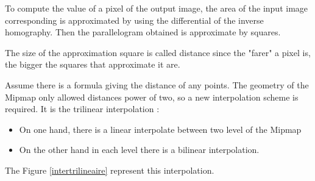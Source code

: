 To compute the value of a pixel of the output image, the area of the input image corresponding is approximated by using the differential of the inverse homography. Then the parallelogram obtained is approximate by squares.

The size of the approximation square is called distance since the "farer" a pixel is, the bigger the squares that approximate it are.

Assume there is a formula giving the distance of any points. The geometry of the Mipmap only allowed distances power of two, so a new interpolation scheme is required. It is the trilinear interpolation :

\begin{itemize}
\item On one hand, there is a linear interpolate between two level of the Mipmap
\item On the other hand in each level there is a bilinear interpolation.
\end{itemize}

The Figure \ref{intertrilineaire} represent this interpolation.






